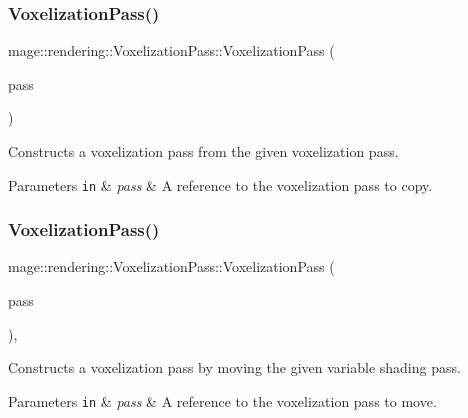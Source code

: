\subsubsection{\texorpdfstring{Voxelization\+Pass()}{VoxelizationPass()}\hspace{0.1cm}{\footnotesize\ttfamily [2/3]}}
{\footnotesize\ttfamily mage\+::rendering\+::\+Voxelization\+Pass\+::\+Voxelization\+Pass (\begin{DoxyParamCaption}\item[{const \hyperlink{classmage_1_1rendering_1_1_voxelization_pass}{Voxelization\+Pass} \&}]{pass }\end{DoxyParamCaption})\hspace{0.3cm}{\ttfamily [delete]}}

Constructs a voxelization pass from the given voxelization pass.


\begin{DoxyParams}[1]{Parameters}
\mbox{\tt in}  & {\em pass} & A reference to the voxelization pass to copy. \\
\hline
\end{DoxyParams}
\hypertarget{classmage_1_1rendering_1_1_voxelization_pass_abbdf28fc21b6b4fe4eebf8ed02ac015d}{}\label{classmage_1_1rendering_1_1_voxelization_pass_abbdf28fc21b6b4fe4eebf8ed02ac015d} 
\subsubsection{\texorpdfstring{Voxelization\+Pass()}{VoxelizationPass()}\hspace{0.1cm}{\footnotesize\ttfamily [3/3]}}
{\footnotesize\ttfamily mage\+::rendering\+::\+Voxelization\+Pass\+::\+Voxelization\+Pass (\begin{DoxyParamCaption}\item[{\hyperlink{classmage_1_1rendering_1_1_voxelization_pass}{Voxelization\+Pass} \&\&}]{pass }\end{DoxyParamCaption})\hspace{0.3cm}{\ttfamily [default]}, {\ttfamily [noexcept]}}

Constructs a voxelization pass by moving the given variable shading pass.


\begin{DoxyParams}[1]{Parameters}
\mbox{\tt in}  & {\em pass} & A reference to the voxelization pass to move. \\
\hline
\end{DoxyParams}
\hypertarget{classmage_1_1rendering_1_1_voxelization_pass_ab989ce6ec60745d7339a1288554dd400}{}\label{classmage_1_1rendering_1_1_voxelization_pass_ab989ce6ec60745d7339a1288554dd400} 
